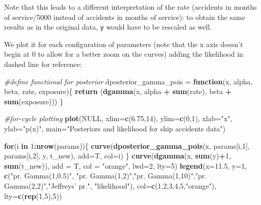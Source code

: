 \documentclass[]{article}
\newenvironment{Shaded}{\begin{snugshade}}{\end{snugshade}}
\newcommand{\KeywordTok}[1]{\textcolor[rgb]{0.13,0.29,0.53}{\textbf{#1}}}
\newcommand{\DataTypeTok}[1]{\textcolor[rgb]{0.13,0.29,0.53}{#1}}
\newcommand{\DecValTok}[1]{\textcolor[rgb]{0.00,0.00,0.81}{#1}}
\newcommand{\FloatTok}[1]{\textcolor[rgb]{0.00,0.00,0.81}{#1}}
\newcommand{\StringTok}[1]{\textcolor[rgb]{0.31,0.60,0.02}{#1}}
\newcommand{\CommentTok}[1]{\textcolor[rgb]{0.56,0.35,0.01}{\textit{#1}}}
\newcommand{\OtherTok}[1]{\textcolor[rgb]{0.56,0.35,0.01}{#1}}
\newcommand{\ControlFlowTok}[1]{\textcolor[rgb]{0.13,0.29,0.53}{\textbf{#1}}}
\newcommand{\OperatorTok}[1]{\textcolor[rgb]{0.81,0.36,0.00}{\textbf{#1}}}
\newcommand{\NormalTok}[1]{#1}
\begin{document}
Note that this leads to a different interpretation of the rate
(accidents in months of service/5000 instead of accidents in months of
service): to obtain the same results as in the original data, \texttt{y}
would have to be rescaled as well.

We plot it for each configuration of parameters (note that the x axis
doesn't begin at 0 to allow for a better zoom on the curves) adding the
likelihood in dashed line for reference:

\begin{Shaded}
\begin{Highlighting}[]
\CommentTok{#define functional for posterior}
\NormalTok{dposterior_gamma_pois =}\StringTok{ }\ControlFlowTok{function}\NormalTok{(x, alpha, beta, rate, exposure)\{}
    \KeywordTok{return}\NormalTok{ (}\KeywordTok{dgamma}\NormalTok{(x, alpha }\OperatorTok{+}\StringTok{ }\KeywordTok{sum}\NormalTok{(rate), beta }\OperatorTok{+}\StringTok{ }\KeywordTok{sum}\NormalTok{(exposure)))}
\NormalTok{\}}

\CommentTok{#for-cycle plotting}
\KeywordTok{plot}\NormalTok{(}\OtherTok{NULL}\NormalTok{, }\DataTypeTok{xlim=}\KeywordTok{c}\NormalTok{(}\FloatTok{6.75}\NormalTok{,}\DecValTok{14}\NormalTok{), }\DataTypeTok{ylim=}\KeywordTok{c}\NormalTok{(}\DecValTok{0}\NormalTok{,}\DecValTok{1}\NormalTok{), }\DataTypeTok{xlab=}\StringTok{"x"}\NormalTok{, }\DataTypeTok{ylab=}\StringTok{"p(x)"}\NormalTok{, }\DataTypeTok{main=}\StringTok{"Posteriors and likelihood for ship accidents data"}\NormalTok{)}

\ControlFlowTok{for}\NormalTok{(i }\ControlFlowTok{in} \DecValTok{1}\OperatorTok{:}\KeywordTok{nrow}\NormalTok{(params))\{}
  \KeywordTok{curve}\NormalTok{(}\KeywordTok{dposterior_gamma_pois}\NormalTok{(x, params[i,}\DecValTok{1}\NormalTok{], params[i,}\DecValTok{2}\NormalTok{], y, t_new), }\DataTypeTok{add=}\NormalTok{T, }\DataTypeTok{col=}\NormalTok{i)  }
\NormalTok{\}}
\KeywordTok{curve}\NormalTok{(}\KeywordTok{dgamma}\NormalTok{(x, }\KeywordTok{sum}\NormalTok{(y)}\OperatorTok{+}\DecValTok{1}\NormalTok{, }\KeywordTok{sum}\NormalTok{(t_new)), }\DataTypeTok{add =}\NormalTok{ T, }\DataTypeTok{col =} \StringTok{"orange"}\NormalTok{, }\DataTypeTok{lwd=}\DecValTok{2}\NormalTok{, }\DataTypeTok{lty=}\DecValTok{5}\NormalTok{)}
\KeywordTok{legend}\NormalTok{(}\DataTypeTok{x=}\FloatTok{11.5}\NormalTok{, }\DataTypeTok{y=}\DecValTok{1}\NormalTok{, }\KeywordTok{c}\NormalTok{(}\StringTok{"pr. Gamma(1,0.5)"}\NormalTok{, }\StringTok{"pr. Gamma(1,2)"}\NormalTok{,}\StringTok{"pr. Gamma(1,10)"}\NormalTok{,}\StringTok{"pr. Gamma(2,2)"}\NormalTok{,}\StringTok{"Jeffreys' pr."}\NormalTok{, }\StringTok{"likelihood"}\NormalTok{), }\DataTypeTok{col=}\KeywordTok{c}\NormalTok{(}\DecValTok{1}\NormalTok{,}\DecValTok{2}\NormalTok{,}\DecValTok{3}\NormalTok{,}\DecValTok{4}\NormalTok{,}\DecValTok{5}\NormalTok{,}\StringTok{"orange"}\NormalTok{), }\DataTypeTok{lty=}\KeywordTok{c}\NormalTok{(}\KeywordTok{rep}\NormalTok{(}\DecValTok{1}\NormalTok{,}\DecValTok{5}\NormalTok{),}\DecValTok{5}\NormalTok{))}
\end{Highlighting}
\end{Shaded}
\end{document}
